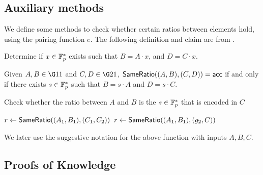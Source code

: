 \documentclass{article}
\begin{document}
\subsection{Auxiliary methods}

We define some methods to check whether certain ratios between elements hold, using the pairing function $e$. The following definition and claim are from \cite{BGG17}.

\begin{algorithm}
\caption{Determine if $x \in {\mathbb F}_p^*$ exists such that $B = A\cdot x$, and $D = C\cdot x$.}
\begin{algorithmic}[1]
      \State
      \Return{\acp}
    \Else
      \State
      \Return{\rej}
    \EndIf
  \EndFunction
\end{algorithmic}
\end{algorithm}

\begin{claim}\label{clm:sameratio}
 Given $A,B\in \G11$ and $C,D\in \G21$,
 $\mathsf{SameRatio}((A,B),(C,D))=\mathsf{acc}$ if and only if
 there exists $s\in {\mathbb F}_p^*$ such that
 $B= s\cdot A$ and $D = s\cdot C$.

\end{claim}

\begin{algorithm}[H]
\caption{Check whether the ratio between $A$ and $B$ is the $s\in {\mathbb F}_p^*$ that is encoded in $C$}
\begin{algorithmic}[1]

      \State $r\gets \mathsf{SameRatio}((A_1,B_1),(C_1,C_2))$
    \Else
      \State $r\gets \mathsf{SameRatio}((A_1,B_1),(g_2,C))$
    \EndIf
      \State
    \Else
      \State
    \EndIf
  \EndFunction
\end{algorithmic}
\end{algorithm}
We later use the suggestive notation  for the above function with inputs $A,B,C$.
\subsection{Proofs of Knowledge}
\end{document}
